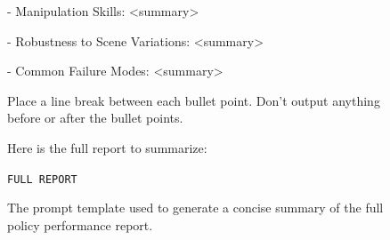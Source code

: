 \begin{figure}[ht!]
{\begin{minipage}{\linewidth}
\vspace{1em}
- Manipulation Skills: \textless{}summary\textgreater{}\par

\vspace{1em}
- Robustness to Scene Variations: \textless{}summary\textgreater{}\par

\vspace{1em}
- Common Failure Modes: \textless{}summary\textgreater{}\par

\vspace{1em}
Place a line break between each bullet point. Don't output anything before or after the bullet points.\par

\vspace{1em}
Here is the full report to summarize:\par

\vspace{1em}
\texttt{FULL REPORT}\par
\end{minipage}}
\caption{The prompt template used to generate a concise summary of the full policy performance report.}
\label{figure:summary_policy_performance_analysis_prompt}
\end{figure}
